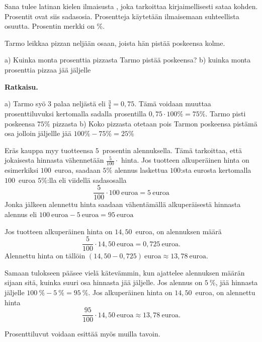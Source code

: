Sana  tulee latinan kielen ilmaisusta ,
joka tarkoittaa kirjaimellisesti sataa kohden. 
Prosentit ovat siis sadasosia.
Prosentteja käytetään ilmaisemaan suhteellista osuutta.
Prosentin merkki on \%.


\begin{esimerkki}
Tarmo leikkaa pizzan neljään osaan, joista hän pistää poskeensa kolme.

a) Kuinka monta prosenttia pizzasta Tarmo pistää poskeensa?
\newline b) kuinka monta prosenttia pizzaa jää jäljelle

\textbf{Ratkaisu.}

a) Tarmo syö 3 palaa neljästä eli $\frac{3}{4} = 0,75$. Tämä voidaan muuttaa prosenttiluvuksi kertomalla sadalla prosentilla $0,75 \cdot 100\% = 75\%$. Tarmo pisti poskeensa $75\%$ pizzasta
\newline b) Koko pizzasta otetaan pois Tarmon poskeensa pistämä osa jolloin jäljellle jää $100\% - 75\% = 25\%$
\end{esimerkki}


\begin{esimerkki}
Eräs kauppa myy tuotteensa $5$~prosentin alennuksella. Tämä tarkoittaa, että jokaisesta hinnasta vähennetään $\frac{5}{100} \cdot$ hinta. Jos tuotteen alkuperäinen hinta on esimerkiksi $100$~euroa, saadaan $5\%$ alennus laskettua $100$:sta eurosta kertomalla $100$~euroa $5\%$:lla eli viidellä sadasosalla 
\[
\frac{5}{100} \cdot 100~\text{euroa} = 5~\text{euroa}
\]
Jonka jälkeen alennettu hinta saadaan vähentämällä alkuperäisestä hinnasta alennus eli $100~\text{euroa} - 5~\text{euroa} = 95~\text{euroa}$

Jos tuotteen alkuperäinen hinta on $14,50$~euroa, on alennuksen määrä
\[
	\frac{5}{100} \cdot 14,50~\text{euroa} = 0,725~\text{euroa}.
\]
Alennettu hinta on tällöin $(14,50 - 0,725)~\text{euroa} \approx 13,78~\text{euroa}$.

Samaan tulokseen pääsee vielä kätevämmin, kun ajattelee alennuksen määrän sijaan sitä, kuinka suuri osa hinnasta jää jäljelle. Jos alennus on $5~\%$, jää hinnasta jäljelle $100~\% - 5~\% = 95~\%$. Jos alkuperäinen hinta on $14,50$~euroa, on alennettu hinta 
\[
	\frac{95}{100} \cdot 14,50~\text{euroa} \approx 13,78~\text{euroa}.
\]
\end{esimerkki}

\begin{esimerkki}
    Prosenttiluvut voidaan esittää myös muilla tavoin.
    \begin{alakohdat}
    \end{alakohdat}
\end{esimerkki}

